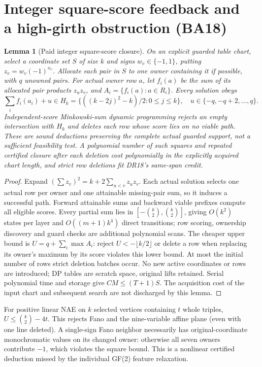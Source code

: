\documentclass[11pt]{article}
\newtheorem{lemma}[theorem]{Lemma}
\begin{document}
\section{Integer square-score feedback and a high-girth obstruction (BA18)}\label{sec:ba18}
\begin{lemma}[Paid integer square-score closure]\label{lem:ba18-square}
On an explicit guarded table chart, select a coordinate set $S$ of size $k$ and signs $w_v\in\{-1,1\}$, putting $z_v=w_v(-1)^{x_v}$. Allocate each pair in $S$ to one owner containing it if possible, with $q$ unowned pairs. For actual owner row $a$, let $f_i(a)$ be the sum of its allocated pair products $z_uz_v$, and $A_i=\{f_i(a):a\in R_i\}$. Every solution obeys
\[
 \sum_i f_i(a_i)+u\in H_k=\{((k-2j)^2-k)/2:0\le j\le k\},\quad
 u\in\{-q,-q+2,\ldots,q\}.
\]
Independent-score Minkowski-sum dynamic programming rejects an empty intersection with $H_k$ and deletes each row whose score lies on no viable path. These are sound deductions preserving the complete actual guarded support, not a sufficient feasibility test. A polynomial number of such squares and repeated certified closure after each deletion cost polynomially in the explicitly acquired chart length, and strict row deletions fit DR18's same-span credit.
\end{lemma}
\begin{proof}
Expand $(\sum z_v)^2=k+2\sum_{u<v}z_uz_v$. Each actual solution selects one actual row per owner and one attainable missing-pair sum, so it induces a successful path. Forward attainable sums and backward viable prefixes compute all eligible scores. Every partial sum lies in $[-\binom{k}{2},\binom{k}{2}]$, giving $O(k^2)$ states per layer and $O((m+1)k^4)$ direct transitions; row scoring, ownership discovery and guard checks are additional polynomial scans. The cheaper upper bound is $U=q+\sum_i\max A_i$: reject $U<-\lfloor k/2\rfloor$ or delete a row when replacing its owner's maximum by its score violates this lower bound. At most the initial number of rows strict deletion batches occur. No new active coordinates or rows are introduced; DP tables are scratch space, original lifts retained. Serial polynomial time and storage give $CM\le(T+1)S$. The acquisition cost of the input chart and subsequent search are not discharged by this lemma.
\end{proof}
For positive linear NAE on $k$ selected vertices containing $t$ whole triples, $U\le\binom{k}{2}-4t$. This rejects Fano and the nine-variable affine plane (even with one line deleted). A single-sign Fano neighbor necessarily has original-coordinate monochromatic values on its changed owner: otherwise all seven owners contribute $-1$, which violates the square bound. This is a nonlinear certified deduction missed by the individual GF(2) feature relaxation.
\end{document}
